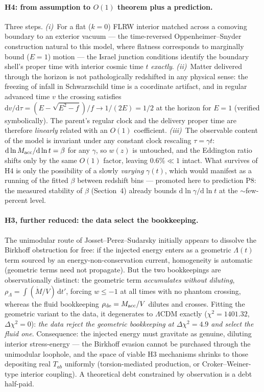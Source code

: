 \documentclass[11pt]{article}
\begin{document}
\paragraph{H4: from assumption to $O(1)$ theorem plus a prediction.} Three steps. \emph{(i)}~For a flat ($k=0$) FLRW interior matched across a comoving boundary to an exterior vacuum --- the time-reversed Oppenheimer--Snyder construction natural to this model, where flatness corresponds to marginally bound ($E=1$) motion --- the Israel junction conditions identify the boundary shell's proper time with interior cosmic time $t$ \emph{exactly}. \emph{(ii)}~Matter delivered through the horizon is not pathologically redshifted in any physical sense: the freezing of infall in Schwarzschild time is a coordinate artifact, and in regular advanced time $v$ the crossing satisfies $\mathrm{d}v/\mathrm{d}\tau = (E-\sqrt{E^2-f})/f \to 1/(2E) = 1/2$ at the horizon for $E=1$ (verified symbolically). The parent's regular clock and the delivery proper time are therefore \emph{linearly} related with an $O(1)$ coefficient. \emph{(iii)}~The observable content of the model is invariant under any constant clock rescaling $\tau = \gamma t$: $\mathrm{d}\ln M_{\rm acc}/\mathrm{d}\ln t = \beta$ for any $\gamma$, so $w(z)$ is untouched, and the Eddington ratio shifts only by the same $O(1)$ factor, leaving $0.6\% \ll 1$ intact. What survives of H4 is only the possibility of a slowly \emph{varying} $\gamma(t)$, which would manifest as a running of the fitted $\beta$ between redshift bins --- promoted here to prediction P8: the measured stability of $\beta$ (Section~4) already bounds $\mathrm{d}\ln\gamma/\mathrm{d}\ln t$ at the $\sim$few-percent level.

\paragraph{H3, further reduced: the data select the bookkeeping.} The unimodular route of Josset--Perez--Sudarsky \cite{Josset2017} initially appears to dissolve the Birkhoff obstruction for free: if the injected energy enters as a geometric $\Lambda(t)$ term sourced by an energy-non-conservation current, homogeneity is automatic (geometric terms need not propagate). But the two bookkeepings are observationally distinct: the geometric term \emph{accumulates without diluting}, $\rho_\Lambda = \int (\dot M/V)\,\mathrm{d}t'$, forcing $w \leq -1$ at all times with no phantom crossing, whereas the fluid bookkeeping $\rho_{\rm de} = M_{\rm acc}/V$ dilutes and crosses. Fitting the geometric variant to the data, it degenerates to $\Lambda$CDM exactly ($\chi^2 = 1401.32$, $\Delta\chi^2 = 0$): \emph{the data reject the geometric bookkeeping at $\Delta\chi^2 = 4.9$ and select the fluid one}. Consequence: the injected energy must gravitate as genuine, diluting interior stress-energy --- the Birkhoff evasion cannot be purchased through the unimodular loophole, and the space of viable H3 mechanisms shrinks to those depositing real $T_{ab}$ uniformly (torsion-mediated production, or Croker--Weiner-type interior coupling). A theoretical debt constrained by observation is a debt half-paid.
\end{document}
